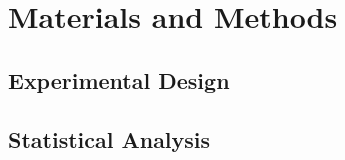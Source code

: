 \documentclass[12pt]{article}
\begin{document}











%
%
%





\section{Materials and Methods}

\subsection{Experimental Design}
\subsection{Statistical Analysis}
\end{document}
